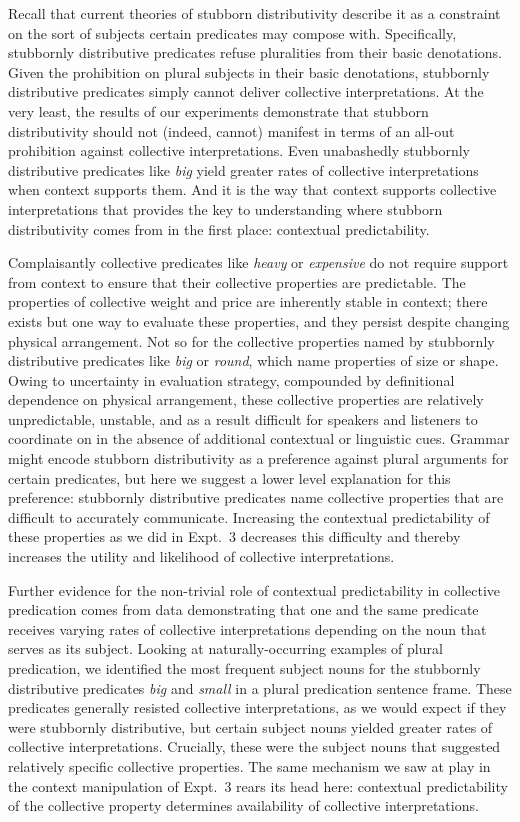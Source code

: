 \documentclass[linguex]{sp}
\begin{document}
Recall that current theories of stubborn distributivity describe it as a constraint on the sort of subjects certain predicates may compose with. Specifically, stubbornly distributive predicates refuse pluralities from their basic denotations. 
Given the prohibition on plural subjects in their basic denotations, stubbornly distributive predicates simply cannot deliver collective interpretations. At the very least, the results of our experiments demonstrate that stubborn distributivity should not (indeed, cannot) manifest in terms of an all-out prohibition against collective interpretations. Even unabashedly stubbornly distributive predicates like \emph{big} yield greater rates of collective interpretations when context supports them. And it is the way that context supports collective interpretations that provides the key to understanding where stubborn distributivity comes from in the first place: contextual predictability.

Complaisantly collective predicates like \emph{heavy} or \emph{expensive} do not require support from context to ensure that their collective properties are predictable. The properties of collective weight and price are inherently stable in context; there exists but one way to evaluate these properties, and they persist despite changing physical arrangement. Not so for the collective properties named by stubbornly distributive predicates like \emph{big} or \emph{round}, which name properties of size or shape. Owing to uncertainty in evaluation strategy, compounded by definitional dependence on physical arrangement, these collective properties are relatively unpredictable, unstable, and as a result difficult for speakers and listeners to coordinate on in the absence of additional contextual or linguistic cues. Grammar might encode stubborn distributivity as a preference against plural arguments for certain predicates, but here we suggest a lower level explanation for this preference: stubbornly distributive predicates name collective properties that are difficult to accurately communicate. Increasing the contextual predictability of these properties as we did in Expt.~3 decreases this difficulty and thereby increases the utility and likelihood of collective interpretations.

Further evidence for the non-trivial role of contextual predictability in collective predication comes from data demonstrating that one and the same predicate receives varying rates of collective interpretations depending on the noun that serves as its subject. Looking at naturally-occurring examples of plural predication, we identified the most frequent subject nouns for the stubbornly distributive predicates \emph{big} and \emph{small} in a plural predication sentence frame. These predicates generally resisted collective interpretations, as we would expect if they were stubbornly distributive, but certain subject nouns yielded greater rates of collective interpretations. Crucially, these were the subject nouns that suggested relatively specific collective properties. 
The same mechanism we saw at play in the context manipulation of Expt.~3 rears its head here: contextual predictability of the collective property determines availability of collective interpretations.
\end{document}
